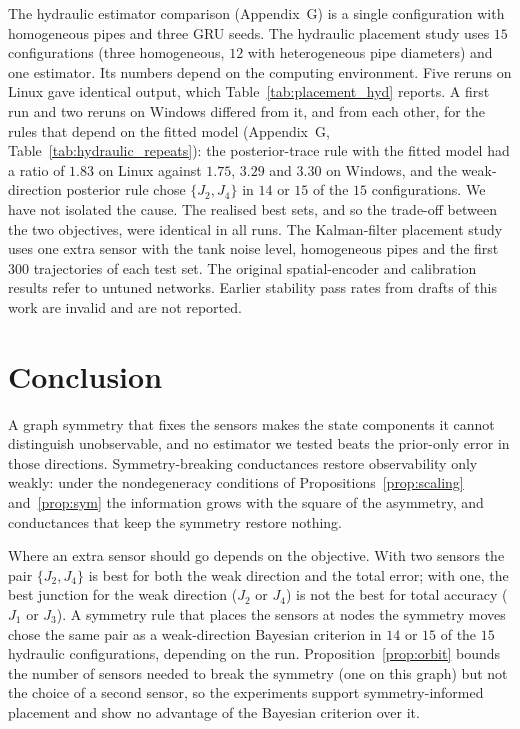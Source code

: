 \documentclass[conference]{IEEEtran}
\begin{document}
The hydraulic estimator comparison (Appendix~G) is a single configuration with homogeneous pipes and three GRU seeds. The hydraulic placement study uses $15$ configurations (three homogeneous, $12$ with heterogeneous pipe diameters) and one estimator. Its numbers depend on the computing environment. Five reruns on Linux gave identical output, which Table~\ref{tab:placement_hyd} reports. A first run and two reruns on Windows differed from it, and from each other, for the rules that depend on the fitted model (Appendix~G, Table~\ref{tab:hydraulic_repeats}): the posterior-trace rule with the fitted model had a ratio of $1.83$ on Linux against $1.75$, $3.29$ and $3.30$ on Windows, and the weak-direction posterior rule chose $\{J_2,J_4\}$ in $14$ or $15$ of the $15$ configurations. We have not isolated the cause. The realised best sets, and so the trade-off between the two objectives, were identical in all runs. The Kalman-filter placement study uses one extra sensor with the tank noise level, homogeneous pipes and the first $300$ trajectories of each test set. The original spatial-encoder and calibration results refer to untuned networks. Earlier stability pass rates from drafts of this work are invalid and are not reported.

\section{Conclusion}
\label{sec:conclusion}

A graph symmetry that fixes the sensors makes the state components it cannot distinguish unobservable, and no estimator we tested beats the prior-only error in those directions. Symmetry-breaking conductances restore observability only weakly: under the nondegeneracy conditions of Propositions~\ref{prop:scaling} and~\ref{prop:sym} the information grows with the square of the asymmetry, and conductances that keep the symmetry restore nothing.

Where an extra sensor should go depends on the objective. With two sensors the pair $\{J_2,J_4\}$ is best for both the weak direction and the total error; with one, the best junction for the weak direction ($J_2$ or $J_4$) is not the best for total accuracy ($J_1$ or $J_3$). A symmetry rule that places the sensors at nodes the symmetry moves chose the same pair as a weak-direction Bayesian criterion in $14$ or $15$ of the $15$ hydraulic configurations, depending on the run. Proposition~\ref{prop:orbit} bounds the number of sensors needed to break the symmetry (one on this graph) but not the choice of a second sensor, so the experiments support symmetry-informed placement and show no advantage of the Bayesian criterion over it.
\end{document}
